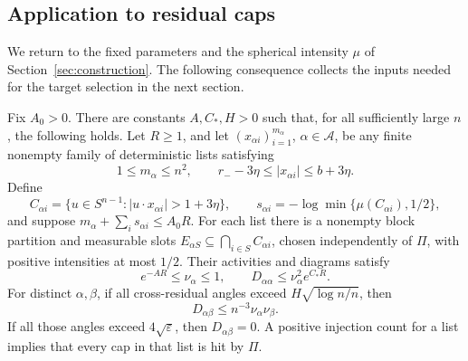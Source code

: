 

\subsection{Application to residual caps}

We return to the fixed parameters and the spherical intensity $\mu$
of Section~\ref{sec:construction}. The following consequence collects
the inputs needed for the target selection in the next section.

\begin{corollary}
\label{cor:witnesses}
Fix $A_0>0$. There are constants $A,C_*,H>0$ such that, for all
sufficiently large $n$, the following holds. Let $R\ge1$, and let
$(x_{\alpha i})_{i=1}^{m_\alpha}$, $\alpha\in\mathcal A$, be any
finite nonempty family of deterministic lists satisfying
\[
 1\le m_\alpha\le n^2,\qquad
 r_--3\eta\le |x_{\alpha i}|\le b+3\eta.
\]
Define
\[
 C_{\alpha i}=\{u\in S^{n-1}:|u\cdot x_{\alpha i}|>1+3\eta\},
 \qquad
 s_{\alpha i}=-\log\min\{\mu(C_{\alpha i}),1/2\},
\]
and suppose $m_\alpha+\sum_i s_{\alpha i}\le A_0R$.
For each list there is a nonempty block partition and measurable slots
$E_{\alpha S}\subseteq\bigcap_{i\in S}C_{\alpha i}$, chosen
independently of $\Pi$, with positive intensities at most $1/2$.
Their activities and diagrams satisfy
\begin{equation}
 e^{-AR}\le\nu_\alpha\le1,\qquad
 D_{\alpha\alpha}\le\nu_\alpha^2e^{C_*R}.
 \label{eq:witness-self}
\end{equation}
For distinct $\alpha,\beta$, if all cross-residual angles exceed
$H\sqrt{\log n/n}$, then
\begin{equation}
 D_{\alpha\beta}\le n^{-3}\nu_\alpha\nu_\beta.
 \label{eq:witness-cross}
\end{equation}
If all those angles exceed $4\sqrt\varepsilon$, then
$D_{\alpha\beta}=0$. A positive injection count for a list implies
that every cap in that list is hit by $\Pi$.
\end{corollary}

